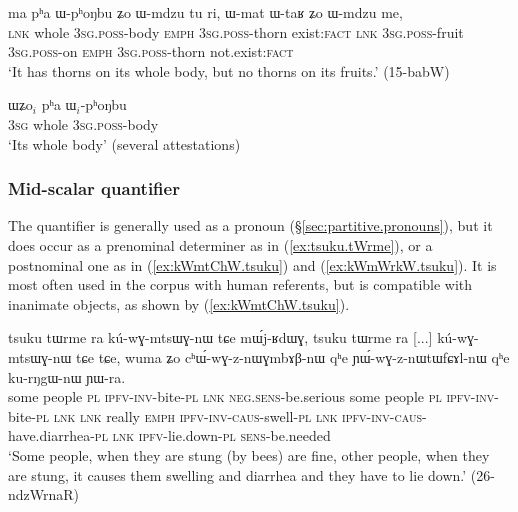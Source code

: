  \begin{exe}
\ex \label{ex:pha.WphoNbu}
\gll ma pʰa ɯ-pʰoŋbu ʑo ɯ-mdzu tu ri, ɯ-mat ɯ-taʁ ʑo ɯ-mdzu me,  \\
\textsc{lnk} whole \textsc{3sg}.\textsc{poss}-body \textsc{emph} \textsc{3sg}.\textsc{poss}-thorn exist:\textsc{fact} \textsc{lnk} \textsc{3sg}.\textsc{poss}-fruit  \textsc{3sg}.\textsc{poss}-on \textsc{emph}   \textsc{3sg}.\textsc{poss}-thorn not.exist:\textsc{fact} \\
\glt `It has thorns on its whole body, but no thorns on its fruits.' (15-babW)
  \end{exe}
  
 \begin{exe}
\ex \label{ex:WZo.pha.WphoNbu}
\gll  ɯʑo$_i$  pʰa ɯ$_i$-pʰoŋbu  \\
\textsc{3sg} whole \textsc{3sg}.\textsc{poss}-body \\
\glt `Its whole body' (several attestations)
\end{exe}
  
\subsubsection{Mid-scalar quantifier} \label{sec:tsuku}
The quantifier  is generally used as a pronoun (§\ref{sec:partitive.pronouns}), but it does occur as a prenominal determiner as in (\ref{ex:tsuku.tWrme}), or a postnominal one as in (\ref{ex:kWmtChW.tsuku}) and (\ref{ex:kWmWrkW.tsuku}). It is most often used in the corpus with human referents, but is compatible with inanimate objects, as shown by (\ref{ex:kWmtChW.tsuku}).

\begin{exe}
\ex \label{ex:tsuku.tWrme}
\gll tsuku tɯrme ra kú-wɣ-mtsɯɣ-nɯ tɕe mɯ́j-ʁdɯɣ, tsuku tɯrme ra [...] kú-wɣ-mtsɯɣ-nɯ tɕe tɕe, wuma ʑo cʰɯ́-wɣ-z-nɯɣmbɤβ-nɯ qʰe ɲɯ́-wɣ-z-nɯtɯfɕɤl-nɯ qʰe ku-rŋgɯ-nɯ ɲɯ-ra.\\
some people \textsc{pl} \textsc{ipfv}-\textsc{inv}-bite-\textsc{pl} \textsc{lnk} \textsc{neg}.\textsc{sens}-be.serious some people \textsc{pl} { } \textsc{ipfv}-\textsc{inv}-bite-\textsc{pl} \textsc{lnk} \textsc{lnk} really \textsc{emph} \textsc{ipfv}-\textsc{inv}-\textsc{caus}-swell-\textsc{pl} \textsc{lnk}  \textsc{ipfv}-\textsc{inv}-\textsc{caus}-have.diarrhea-\textsc{pl} \textsc{lnk} \textsc{ipfv}-lie.down-\textsc{pl} \textsc{sens}-be.needed\\
\glt `Some people, when they are stung (by bees) are fine, other people, when they are stung, it causes them swelling and diarrhea and they have to lie down.' (26-ndzWrnaR)
\end{exe}

